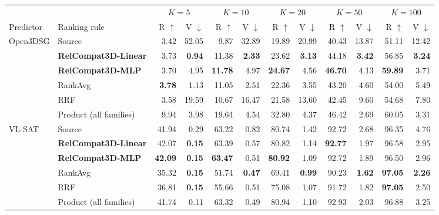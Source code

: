 \begin{table}[!t]
    \centering
    {\small
    \setlength{\tabcolsep}{2.0pt}
    \begin{tabular}{@{}llrrrrrrrrrr@{}}
    \toprule
    & & \multicolumn{2}{c}{$K=5$} & \multicolumn{2}{c}{$K=10$} &
    \multicolumn{2}{c}{$K=20$} & \multicolumn{2}{c}{$K=50$} &
    \multicolumn{2}{c}{$K=100$} \\
    \cmidrule(lr){3-4}\cmidrule(lr){5-6}\cmidrule(lr){7-8}\cmidrule(lr){9-10}\cmidrule(lr){11-12}
    Predictor & Ranking rule & R $\uparrow$ & V $\downarrow$ & R $\uparrow$ & V $\downarrow$ & R $\uparrow$ & V $\downarrow$ & R $\uparrow$ & V $\downarrow$ & R $\uparrow$ & V $\downarrow$ \\
    \midrule
    \multirow{6}{*}{Open3DSG}
    & Source & 3.42 & 52.05 & 9.87 & 32.89 & 19.89 & 20.99 & 40.43 & 13.87 & 51.11 & 12.42 \\
    & \textbf{RelCompat3D-Linear} & 3.73 & \textbf{0.94} & 11.38 & \textbf{2.33} & 23.62 & \textbf{3.13} & 44.18 & \textbf{3.42} & 56.85 & \textbf{3.24} \\
    & \textbf{RelCompat3D-MLP} & 3.70 & 4.95 & \textbf{11.78} & 4.97 & \textbf{24.67} & 4.56 & \textbf{46.70} & 4.13 & \textbf{59.89} & 3.71 \\
    & RankAvg & \textbf{3.78} & 1.13 & 11.05 & 2.51 & 22.36 & 3.55 & 43.20 & 4.60 & 54.00 & 5.49 \\
    & RRF & 3.58 & 19.59 & 10.67 & 16.47 & 21.58 & 13.60 & 42.45 & 9.60 & 54.68 & 7.80 \\
    & Product (all families) & 9.94 & 3.98 & 19.64 & 4.54 & 32.80 & 4.37 & 46.42 & 2.69 & 60.05 & 3.31 \\
    \midrule
    \multirow{6}{*}{VL-SAT}
    & Source & 41.94 & 0.29 & 63.22 & 0.82 & 80.74 & 1.42 & 92.72 & 2.68 & 96.35 & 4.76 \\
    & \textbf{RelCompat3D-Linear} & 42.07 & \textbf{0.15} & 63.39 & 0.57 & 80.82 & 1.14 & \textbf{92.77} & 1.97 & 96.58 & 2.95 \\
    & \textbf{RelCompat3D-MLP} & \textbf{42.09} & \textbf{0.15} & \textbf{63.47} & 0.51 & \textbf{80.92} & 1.09 & 92.72 & 1.89 & 96.50 & 2.96 \\
    & RankAvg & 35.32 & \textbf{0.15} & 51.74 & \textbf{0.47} & 69.41 & \textbf{0.99} & 90.23 & \textbf{1.62} & \textbf{97.05} & \textbf{2.26} \\
    & RRF & 36.81 & \textbf{0.15} & 55.66 & 0.51 & 75.08 & 1.07 & 91.72 & 1.82 & \textbf{97.05} & 2.50 \\
    & Product (all families) & 41.74 & 0.11 & 63.32 & 0.49 & 80.94 & 1.10 & 92.93 & 2.03 & 96.88 & 3.25 \\

\end{tabular}}
\end{table}
